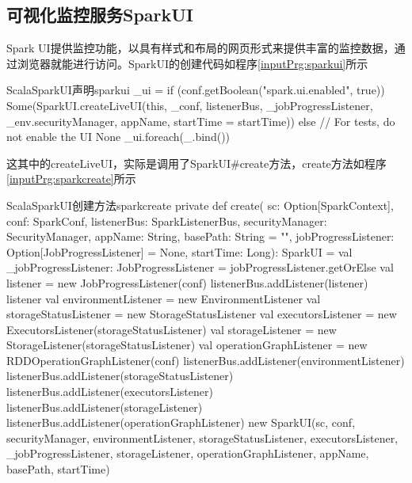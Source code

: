 \subsection{可视化监控服务SparkUI}
Spark UI提供监控功能，以具有样式和布局的网页形式来提供丰富的监控数据，通过浏览器就能进行访问。SparkUI的创建代码如程序\ref{inputPrg:sparkui}所示
\begin{codeInput}{Scala}{SparkUI声明}{sparkui}
    _ui =
    if (conf.getBoolean("spark.ui.enabled", true)) {
      Some(SparkUI.createLiveUI(this, _conf, listenerBus, _jobProgressListener,
      _env.securityManager, appName, startTime = startTime))
    } else {
      // For tests, do not enable the UI
      None
    }
    _ui.foreach(_.bind())
\end{codeInput}
这其中的createLiveUI，实际是调用了SparkUI\#create方法，create方法如程序\ref{inputPrg:sparkcreate}所示
\begin{codeInput}{Scala}{SparkUI创建方法}{sparkcreate}
private def create(
  sc: Option[SparkContext],
  conf: SparkConf,
  listenerBus: SparkListenerBus,
  securityManager: SecurityManager,
  appName: String,
  basePath: String = "",
  jobProgressListener: Option[JobProgressListener] = None,
  startTime: Long): SparkUI = {
    val _jobProgressListener: JobProgressListener = jobProgressListener.getOrElse {
    val listener = new JobProgressListener(conf)
    listenerBus.addListener(listener) listener
  }
  val environmentListener = new EnvironmentListener
  val storageStatusListener = new StorageStatusListener
  val executorsListener = new ExecutorsListener(storageStatusListener)
  val storageListener = new StorageListener(storageStatusListener)
  val operationGraphListener = new RDDOperationGraphListener(conf)	
  listenerBus.addListener(environmentListener)
  listenerBus.addListener(storageStatusListener)
  listenerBus.addListener(executorsListener)
  listenerBus.addListener(storageListener)
  listenerBus.addListener(operationGraphListener)		
  new SparkUI(sc, conf, securityManager, environmentListener, storageStatusListener,
  executorsListener, _jobProgressListener, storageListener, operationGraphListener,
  appName, basePath, startTime)
}
\end{codeInput}

